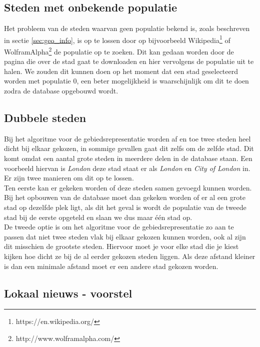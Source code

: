 \documentclass[twoside,openright]{uva-bachelor-thesis}
\begin{document}
		\subsection{Steden met onbekende populatie}
			\label{sec:citiespop}
			Het probleem van de steden waarvan geen populatie bekend is, zoals beschreven in sectie \ref{sec:geo_info}, is op te lossen door op bijvoorbeeld Wikipedia\footnote{https://en.wikipedia.org/} of WolframAlpha\footnote{http://www.wolframalpha.com/} de populatie op te zoeken. Dit kan gedaan worden door de pagina die over de stad gaat te downloaden en hier vervolgens de populatie uit te halen. We zouden dit kunnen doen op het moment dat een stad geselecteerd worden met populatie $0$, een beter mogelijkheid is waarschijnlijk om dit te doen zodra de database opgebouwd wordt.
		\subsection{Dubbele steden}
			\label{sec:multcities}
			Bij het algoritme voor de gebiedsrepresentatie worden af en toe twee steden heel dicht bij elkaar gekozen, in sommige gevallen gaat dit zelfs om de zelfde stad. Dit komt omdat een aantal grote steden in meerdere delen in de database staan. Een voorbeeld hiervan is \textit{London} deze stad staat er als \textit{London} en \textit{City of London} in. Er zijn twee manieren om dit op te lossen.\\[0.5cm]
			Ten eerste kan er gekeken worden of deze steden samen gevoegd kunnen worden. Bij het opbouwen van de database moet dan gekeken worden of er al een grote stad op dezelfde plek ligt, als dit het geval is wordt de populatie van de tweede stad bij de eerste opgeteld en slaan we dus maar \'e\'en stad op.\\[0.5cm]
			De tweede optie is om het algoritme voor de gebiedsrepresentatie zo aan te passen dat niet twee steden vlak bij elkaar gekozen kunnen worden, ook al zijn dit misschien de grootste steden. Hiervoor moet je voor elke stad die je kiest kijken hoe dicht ze bij de al eerder gekozen steden liggen. Als deze afstand kleiner is dan een minimale afstand moet er een andere stad gekozen worden.
		\subsection{Lokaal nieuws - voorstel}
	
\end{document}

